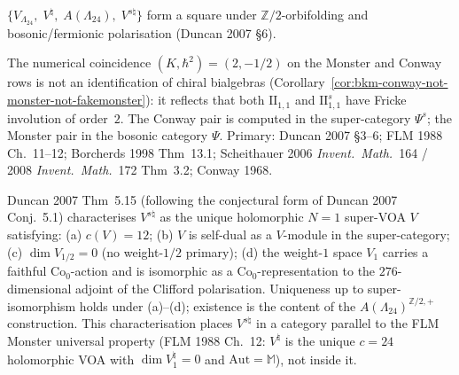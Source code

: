 \begin{remark}
\begin{enumerate}[label=\textup{(\roman*)}]
$\{V_{\Lambda_{24}},\;V^\natural,\;A(\Lambda_{24}),\;V^{s\natural}\}$
form a square under $\mathbb{Z}/2$-orbifolding and bosonic/fermionic
polarisation (Duncan 2007 \S6).
\end{enumerate}
The numerical coincidence $(K,\hbar^2) = (2,-1/2)$ on the Monster
and Conway rows is not an identification of chiral bialgebras
(Corollary~\ref{cor:bkm-conway-not-monster-not-fakemonster}): it
reflects that both $\mathrm{II}_{1,1}$ and $\mathrm{II}_{1,1}^{s}$
have Fricke involution of order~$2$. The Conway pair is computed
in the super-category $\Psi^{s}$; the Monster pair in the bosonic
category $\Psi$.
Primary: Duncan 2007 \S3--6; FLM 1988 Ch.~11--12;
Borcherds 1998 Thm~13.1;
Scheithauer 2006 \emph{Invent.\ Math.}~164 /
2008 \emph{Invent.\ Math.}~172 Thm~3.2;
Conway 1968.
\end{remark}

\begin{definition}
\label{def:bkm-conway-vssharp-universal-property}
Duncan 2007 Thm~5.15 (following the conjectural form of Duncan 2007 Conj.~5.1)
characterises $V^{s\natural}$ as the unique holomorphic $N{=}1$ super-VOA
$V$ satisfying: (a) $c(V) = 12$; (b) $V$ is self-dual as a
$V$-module in the super-category; (c) $\dim V_{1/2} = 0$ (no
weight-$1/2$ primary); (d) the weight-$1$ space $V_1$ carries a
faithful $\mathrm{Co}_0$-action and is isomorphic as a
$\mathrm{Co}_0$-representation to the $276$-dimensional adjoint of
the Clifford polarisation. Uniqueness up to super-isomorphism holds
under (a)--(d); existence is the content of the
$A(\Lambda_{24})^{\mathbb{Z}/2,+}$ construction. This
characterisation places $V^{s\natural}$ in a category parallel to
the FLM Monster universal property (FLM 1988 Ch.~12:
$V^\natural$ is the unique $c = 24$ holomorphic VOA with
$\dim V^\natural_1 = 0$ and $\mathrm{Aut} = \mathbb{M}$), not
inside it.
\end{definition}

